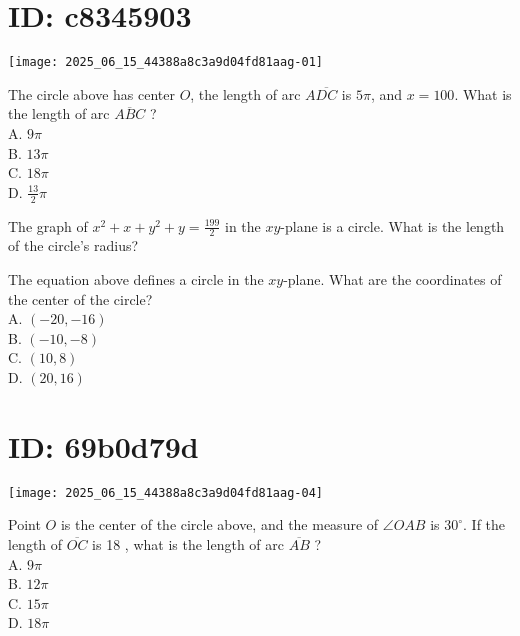 

\section*{ID: c8345903}
\begin{center}
\texttt{[image: 2025\_06\_15\_44388a8c3a9d04fd81aag-01]}
\end{center}

The circle above has center $O$, the length of arc $A \overline{D C}$ is $5 \pi$, and $x=100$. What is the length of arc $\overline{A B C}$ ?\\
A. $9 \pi$\\
B. $13 \pi$\\
C. $18 \pi$\\
D. $\frac{13}{2} \pi$

The graph of $x^{2}+x+y^{2}+y=\frac{199}{2}$ in the $x y$-plane is a circle. What is the length of the circle's radius?

The equation above defines a circle in the $x y$-plane. What are the coordinates of the center of the circle?\\
A. $(-20,-16)$\\
B. $(-10,-8)$\\
C. $(10,8)$\\
D. $(20,16)$

\section*{ID: 69b0d79d}
\begin{center}
\texttt{[image: 2025\_06\_15\_44388a8c3a9d04fd81aag-04]}
\end{center}

Point $O$ is the center of the circle above, and the measure of $\angle O A B$ is $30^{\circ}$. If the length of $\overline{O C}$ is 18 , what is the length of arc $\overline{A B}$ ?\\
A. $9 \pi$\\
B. $12 \pi$\\
C. $15 \pi$\\
D. $18 \pi$

